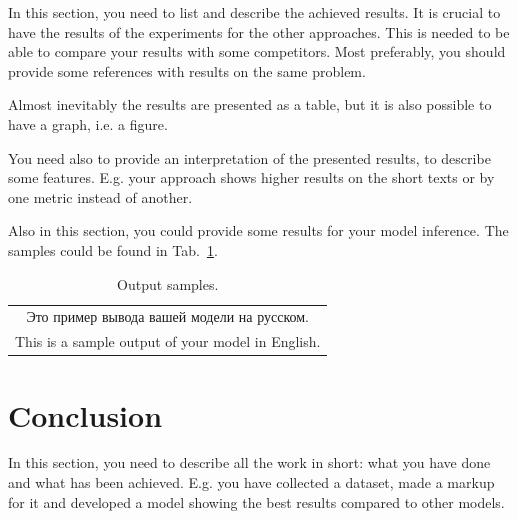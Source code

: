 \documentclass{article}
\begin{document}
In this section, you need to list and describe the achieved results. It is crucial to have the results of the experiments for the other approaches. This is needed to be able to compare your results with some competitors. Most preferably, you should provide some references with results on the same problem.

Almost inevitably the results are presented as a table, but it is also possible to have a graph, i.e. a figure.

You need also to provide an interpretation of the presented results, to describe some features. E.g. your approach shows higher results on the short texts or by one metric instead of another.

Also in this section, you could provide some results for your model inference. The samples could be found in Tab.~\ref{tab:output}.

\begin{table}[!tbh]
    \centering
    \begin{tabular}{|c|}
\hline
Это пример вывода вашей модели на русском.\\
This is a sample output of your model in English.
\\
\hline
    \end{tabular}
    \caption{Output samples.}
    \label{tab:output}
\end{table}

\section{Conclusion}
In this section, you need to describe all the work in short: what you have done and what has been achieved. E.g. you have collected a dataset, made a markup for it and developed a model showing the best results compared to other models. 



\end{document}
